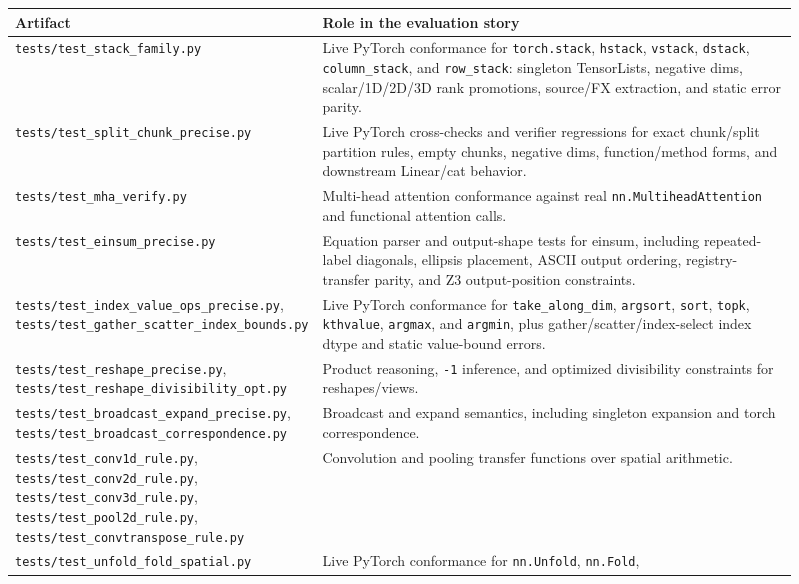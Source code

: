 \documentclass[11pt]{article}
\begin{document}
\begin{longtable}{|p{0.30\linewidth}|p{0.61\linewidth}|}
\hline
\textbf{Artifact} & \textbf{Role in the evaluation story} \\
\hline
\texttt{tests/test\_stack\_family.py} &
Live PyTorch conformance for \texttt{torch.stack}, \texttt{hstack},
\texttt{vstack}, \texttt{dstack}, \texttt{column\_stack}, and
\texttt{row\_stack}: singleton TensorLists, negative dims, scalar/1D/2D/3D
rank promotions, source/FX extraction, and static error parity. \\
\hline
\texttt{tests/test\_split\_chunk\_precise.py} &
Live PyTorch cross-checks and verifier regressions for exact chunk/split
partition rules, empty chunks, negative dims, function/method forms, and
downstream Linear/cat behavior. \\
\hline
\texttt{tests/test\_mha\_verify.py} &
Multi-head attention conformance against real \texttt{nn.MultiheadAttention}
and functional attention calls. \\
\hline
\texttt{tests/test\_einsum\_precise.py} &
Equation parser and output-shape tests for einsum, including repeated-label
diagonals, ellipsis placement, ASCII output ordering, registry-transfer parity,
and Z3 output-position constraints. \\
\hline
\texttt{tests/test\_index\_value\_ops\_precise.py},
\texttt{tests/test\_gather\_scatter\_index\_bounds.py} &
Live PyTorch conformance for \texttt{take\_along\_dim}, \texttt{argsort},
\texttt{sort}, \texttt{topk}, \texttt{kthvalue}, \texttt{argmax}, and
\texttt{argmin}, plus gather/scatter/index-select index dtype and static
value-bound errors. \\
\hline
\texttt{tests/test\_reshape\_precise.py},
\texttt{tests/test\_reshape\_divisibility\_opt.py} &
Product reasoning, \texttt{-1} inference, and optimized divisibility
constraints for reshapes/views. \\
\hline
\texttt{tests/test\_broadcast\_expand\_precise.py},
\texttt{tests/test\_broadcast\_correspondence.py} &
Broadcast and expand semantics, including singleton expansion and torch
correspondence. \\
\hline
\texttt{tests/test\_conv1d\_rule.py},
\texttt{tests/test\_conv2d\_rule.py},
\texttt{tests/test\_conv3d\_rule.py},
\texttt{tests/test\_pool2d\_rule.py},
\texttt{tests/test\_convtranspose\_rule.py} &
Convolution and pooling transfer functions over spatial arithmetic. \\
\hline
\texttt{tests/test\_unfold\_fold\_spatial.py} &
Live PyTorch conformance for \texttt{nn.Unfold}, \texttt{nn.Fold},

\end{longtable}
\end{document}
